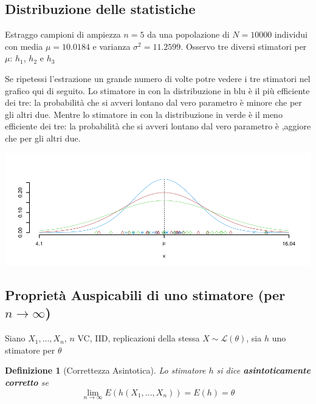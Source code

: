 \documentclass[
  11pt,
]{book}
\theoremstyle{mytheoremstyle}
\theoremstyle{mydefstyle}
\newtheorem{definition}{Definizione}[section]
\begin{document}
\subsection{Distribuzione delle statistiche}\label{distribuzione-delle-statistiche}

Estraggo campioni di ampiezza \(n=5\) da una popolazione di \(N=10000\) individui con media \(\mu=10.0184\) e varianza \(\sigma^2=11.2599\).
Osservo tre diversi stimatori per \(\mu\): \(h_1\), \(h_2\) e \(h_3\)

Se ripetessi l'estrazione un grande numero di volte potre vedere i tre stimatori nel grafico qui di seguito.
Lo stimatore in con la distribuzione in blu è il più efficiente dei tre: la probabilità che si avveri lontano dal vero parametro è minore che per gli altri due.
Mentre lo stimatore in con la distribuzione in verde è il meno efficiente dei tre: la probabilità che si avveri lontano dal vero parametro è ,aggiore che per gli altri due.

\begin{center}\includegraphics{Appunti_di_Statistica_2025_files/figure-latex/11-Stima-8-1} \end{center}

\subsection{\texorpdfstring{Proprietà Auspicabili di uno stimatore (per \(n\to\infty\))}{Proprietà Auspicabili di uno stimatore (per n\textbackslash to\textbackslash infty)}}\label{proprietuxe0-auspicabili-di-uno-stimatore-per-ntoinfty}

Siano \(X_1,...,X_n\), \(n\) VC, IID, replicazioni della stessa \(X\sim\mathscr{L}(\theta)\), sia \(h\) uno stimatore per \(\theta\)

\begin{info}

\begin{definition}[Correttezza Asintotica]
Lo stimatore \(h\) si dice \textbf{asintoticamente corretto} se
\[\lim_{n\to\infty}E(h(X_1,...,X_n))=E(h)=\theta\]
\end{definition}

\end{info}
\end{document}

